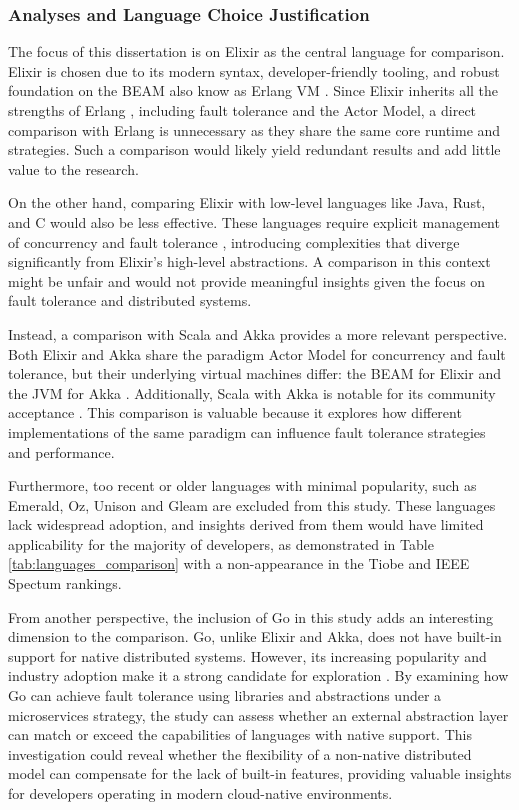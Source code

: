 \subsubsection{Analyses and Language Choice Justification}

The focus of this dissertation is on Elixir as the central language for comparison. Elixir is chosen due to its modern syntax, developer-friendly tooling, and robust foundation on the \gls{BEAM} also know as Erlang \gls{VM} \cite{Juric2024}. Since Elixir inherits all the strengths of Erlang \cite{Valkov2018}, including fault tolerance and the Actor Model, a direct comparison with Erlang is unnecessary as they share the same core runtime and strategies. Such a comparison would likely yield redundant results and add little value to the research.

On the other hand, comparing Elixir with low-level languages like Java, Rust, and C would also be less effective. These languages require explicit management of concurrency and fault tolerance \cite{Valkov2018}, introducing complexities that diverge significantly from Elixir's high-level abstractions. A comparison in this context might be unfair and would not provide meaningful insights given the focus on fault tolerance and distributed systems.

Instead, a comparison with Scala and Akka provides a more relevant perspective. Both Elixir and Akka share the paradigm Actor Model for concurrency and fault tolerance, but their underlying virtual machines differ: the BEAM for Elixir and the \gls{JVM} for Akka \cite{Abraham2023}. Additionally, Scala with Akka is notable for its community acceptance \cite{Valkov2018}. This comparison is valuable because it explores how different implementations of the same paradigm can influence fault tolerance strategies and performance.

Furthermore, too recent or older languages with minimal popularity, such as Emerald, Oz, Unison and Gleam are excluded from this study. These languages lack widespread adoption, and insights derived from them would have limited applicability for the majority of developers, as demonstrated in Table \ref{tab:languages_comparison} with a non-appearance in the Tiobe and IEEE Spectum rankings.

From another perspective, the inclusion of Go in this study adds an interesting dimension to the comparison. Go, unlike Elixir and Akka, does not have built-in support for native distributed systems. However, its increasing popularity and industry adoption make it a strong candidate for exploration \cite{Brolos2021}. By examining how Go can achieve fault tolerance using libraries and abstractions under a microservices strategy, the study can assess whether an external abstraction layer can match or exceed the capabilities of languages with native support. This investigation could reveal whether the flexibility of a non-native distributed model can compensate for the lack of built-in features, providing valuable insights for developers operating in modern cloud-native environments.

